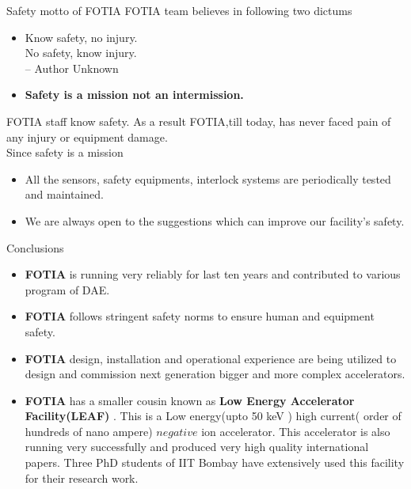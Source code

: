 \documentclass[11pt]{beamer}
\begin{document}
\begin{frame}{Safety motto of FOTIA}
FOTIA team believes in following two dictums
\begin{itemize}
\item Know safety, no injury.\\
     No safety, know injury. \\
      -- Author Unknown			
\item \textbf{Safety is a mission not an intermission.} 
\end{itemize} 

FOTIA staff know safety. As a result FOTIA,till today, has never faced pain of any injury or equipment damage.\\
Since safety is a mission 
\begin{itemize}
\item 	All the sensors, safety equipments, interlock systems are periodically tested and maintained.
\item 	We are always open to the suggestions which can improve our facility's safety.	
 
\end{itemize} 

\end{frame}



\begin{frame}{Conclusions}
\begin{itemize}

\item \textbf{FOTIA} is running very reliably for last ten years and contributed to various program of DAE.

\item \textbf{FOTIA} follows stringent safety norms to ensure human and equipment safety.

\item \textbf{FOTIA} design, installation and operational experience are being utilized to design and commission next generation bigger and more complex accelerators.

\item \textbf{FOTIA} has a smaller cousin known as \textbf{Low Energy Accelerator Facility(LEAF)} . This is a Low energy(upto 50 keV ) high current( order of hundreds of nano ampere) $negative$ ion accelerator. This accelerator is also running very successfully and produced very high quality international papers. Three PhD students of IIT Bombay have extensively used this facility for their research work.



\end{itemize}
\end{frame}
\end{document}
